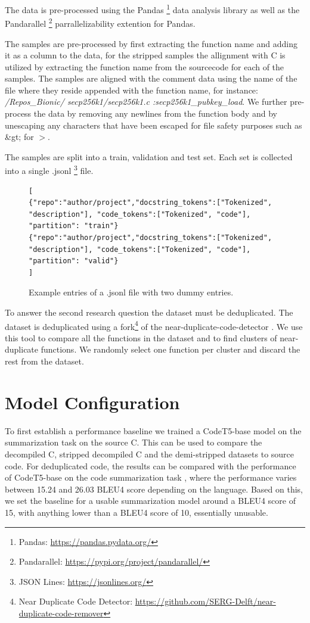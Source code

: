 The data is pre-processed using the Pandas \footnote{Pandas: \url{https://pandas.pydata.org/}} data analysis library as well as the Pandarallel \footnote{Pandarallel: \url{https://pypi.org/project/pandarallel/}} parrallelizability extention for Pandas.

The samples are pre-processed by first extracting the function name and adding it as a column to the data, for the stripped samples the allignment with C is utilized by extracting the function name from the sourcecode for each of the samples. The samples are aligned with the comment data using the name of the file where they reside appended with the function name, for instance: \textit{/Repos\_Bionic/ secp256k1/secp256k1.c :secp256k1\_pubkey\_load}. We further pre-process the data by removing any newlines from the function body and by unescaping any characters that have been escaped for file safety purposes such as \&gt; for $>$.

The samples are split into a train, validation and test set. Each set is collected into a single .jsonl \footnote{JSON Lines: \url{https://jsonlines.org/}} file.

\label{fig:jsonl}
\begin{figure}[H]
  \centering
\begin{lstlisting}[breaklines=true]
[
{"repo":"author/project","docstring_tokens":["Tokenized", "description"], "code_tokens":["Tokenized", "code"], "partition": "train"}
{"repo":"author/project","docstring_tokens":["Tokenized", "description"], "code_tokens":["Tokenized", "code"], "partition": "valid"}
]
\end{lstlisting}
  \caption{Example entries of a .jsonl file with two dummy entries.}
\end{figure}


To answer the second research question the dataset must be deduplicated. The dataset is deduplicated using a fork\footnote{Near Duplicate Code Detector: \url{https://github.com/SERG-Delft/near-duplicate-code-remover}} of the near-duplicate-code-detector \cite{allamanis_adverse}. We use this tool to compare all the functions in the dataset and to find clusters of near-duplicate functions. We randomly select one function per cluster and discard the rest from the dataset. 


\section{Model Configuration}
To first establish a performance baseline we trained a CodeT5-base model on the summarization task on the source C. This can be used to compare the decompiled C, stripped decompiled C and the demi-stripped datasets to source code. For deduplicated code, the results can be compared with the performance of CodeT5-base on the code summarization task \cite{CodeT5}, where the performance varies between 15.24 and 26.03 BLEU4 score depending on the language. Based on this, we set the baseline for a usable summarization model around a BLEU4 score of 15, with anything lower than a BLEU4 score of 10, essentially unusable.


